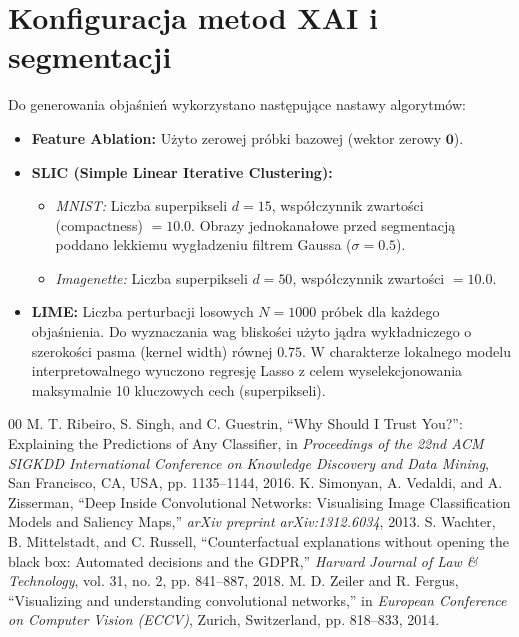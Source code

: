 \documentclass[conference]{IEEEtran}
\begin{document}
\section{Konfiguracja metod XAI i segmentacji}
Do generowania objaśnień wykorzystano następujące nastawy algorytmów:
\begin{itemize}
    \item \textbf{Feature Ablation:} Użyto zerowej próbki bazowej (wektor zerowy $\mathbf{0}$).
    \item \textbf{SLIC (Simple Linear Iterative Clustering):}
    \begin{itemize}
        \item \textit{MNIST:} Liczba superpikseli $d = 15$, współczynnik zwartości (compactness) $= 10.0$. Obrazy jednokanałowe przed segmentacją poddano lekkiemu wygładzeniu filtrem Gaussa ($\sigma = 0.5$).
        \item \textit{Imagenette:} Liczba superpikseli $d = 50$, współczynnik zwartości $= 10.0$.
    \end{itemize}
    \item \textbf{LIME:} Liczba perturbacji losowych $N = 1000$ próbek dla każdego objaśnienia. Do wyznaczania wag bliskości użyto jądra wykładniczego o szerokości pasma (kernel width) równej $0.75$. W charakterze lokalnego modelu interpretowalnego wyuczono regresję Lasso z celem wyselekcjonowania maksymalnie 10 kluczowych cech (superpikseli).
\end{itemize}

\begin{thebibliography}{00}
 M. T. Ribeiro, S. Singh, and C. Guestrin, ``Why Should I Trust You?'': Explaining the Predictions of Any Classifier, in \textit{Proceedings of the 22nd ACM SIGKDD International Conference on Knowledge Discovery and Data Mining}, San Francisco, CA, USA, pp. 1135--1144, 2016.
 K. Simonyan, A. Vedaldi, and A. Zisserman, ``Deep Inside Convolutional Networks: Visualising Image Classification Models and Saliency Maps,'' \textit{arXiv preprint arXiv:1312.6034}, 2013.
 S. Wachter, B. Mittelstadt, and C. Russell, ``Counterfactual explanations without opening the black box: Automated decisions and the GDPR,'' \textit{Harvard Journal of Law \& Technology}, vol. 31, no. 2, pp. 841--887, 2018.
 M. D. Zeiler and R. Fergus, ``Visualizing and understanding convolutional networks,'' in \textit{European Conference on Computer Vision (ECCV)}, Zurich, Switzerland, pp. 818--833, 2014.
\end{thebibliography}
\end{document}
